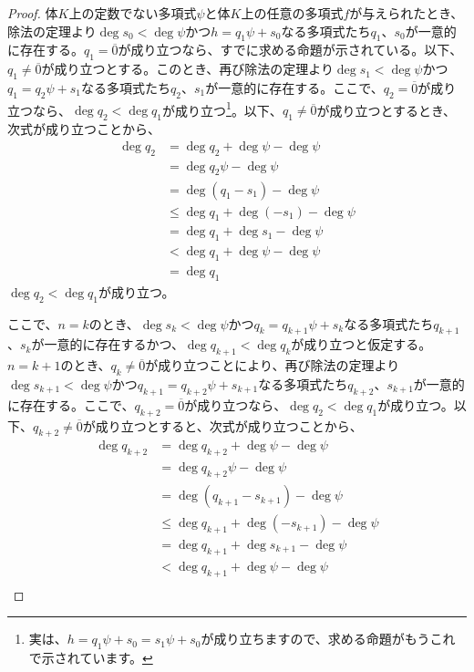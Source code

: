 \documentclass[dvipdfmx]{jsarticle}
\begin{document}
\begin{proof}
体$K$上の定数でない多項式$\psi$と体$K$上の任意の多項式$f$が与えられたとき、除法の定理より$\deg s_{0} < \deg\psi$かつ$h = q_{1}\psi + s_{0}$なる多項式たち$q_{1}$、$s_{0}$が一意的に存在する。$q_{1} = \overline{0}$が成り立つなら、すでに求める命題が示されている。以下、$q_{1} \neq \overline{0}$が成り立つとする。このとき、再び除法の定理より$\deg s_{1} < \deg\psi$かつ$q_{1} = q_{2}\psi + s_{1}$なる多項式たち$q_{2}$、$s_{1}$が一意的に存在する。ここで、$q_{2} = \overline{0}$が成り立つなら、$\deg q_{2} < \deg q_{1}$が成り立つ\footnote{実は、$h = q_{1}\psi + s_{0} = s_{1}\psi + s_{0}$が成り立ちますので、求める命題がもうこれで示されています。}。以下、$q_{1} \neq \overline{0}$が成り立つとするとき、次式が成り立つことから、
\begin{align*}
\deg q_{2} &= \deg q_{2} + \deg\psi - \deg\psi\\
&= \deg{q_{2}\psi} - \deg\psi\\
&= \deg\left( q_{1} - s_{1} \right) - \deg\psi\\
&\leq \deg q_{1} + \deg\left( - s_{1} \right) - \deg\psi\\
&= \deg q_{1} + \deg s_{1} - \deg\psi\\
&< \deg q_{1} + \deg\psi - \deg\psi\\
&= \deg q_{1}
\end{align*}
$\deg q_{2} < \deg q_{1}$が成り立つ。\par
ここで、$n = k$のとき、$\deg s_{k} < \deg\psi$かつ$q_{k} = q_{k + 1}\psi + s_{k}$なる多項式たち$q_{k + 1}$、$s_{k}$が一意的に存在するかつ、$\deg q_{k + 1} < \deg q_{k}$が成り立つと仮定する。$n = k + 1$のとき、$q_{k} \neq \overline{0}$が成り立つことにより、再び除法の定理より$\deg s_{k + 1} < \deg\psi$かつ$q_{k + 1} = q_{k + 2}\psi + s_{k + 1}$なる多項式たち$q_{k + 2}$、$s_{k + 1}$が一意的に存在する。ここで、$q_{k + 2} = \overline{0}$が成り立つなら、$\deg q_{2} < \deg q_{1}$が成り立つ。以下、$q_{k + 2} \neq \overline{0}$が成り立つとすると、次式が成り立つことから、
\begin{align*}
\deg q_{k + 2} &= \deg q_{k + 2} + \deg\psi - \deg\psi\\
&= \deg{q_{k + 2}\psi} - \deg\psi\\
&= \deg\left( q_{k + 1} - s_{k + 1} \right) - \deg\psi\\
&\leq \deg q_{k + 1} + \deg\left( - s_{k + 1} \right) - \deg\psi\\
&= \deg q_{k + 1} + \deg s_{k + 1} - \deg\psi\\
&< \deg q_{k + 1} + \deg\psi - \deg\psi\\

\end{align*}
\end{proof}
\end{document}
